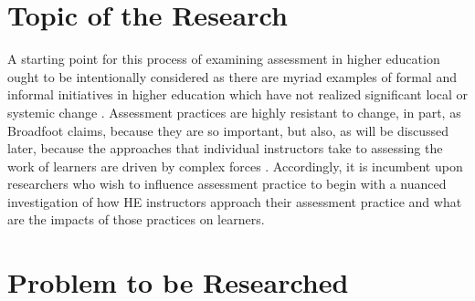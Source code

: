 \documentclass[
]{book}
\begin{document}
\hypertarget{topic-of-the-research}{%
\section*{Topic of the Research}\label{topic-of-the-research}}

A starting point for this process of examining assessment in higher education ought to be intentionally considered as there are myriad examples of formal and informal initiatives in higher education which have not realized significant local or systemic change \citep{broadfootAssessmentTwentyFirstCenturyLearning2016, earlAssessmentLearningUsing2013}. Assessment practices are highly resistant to change, in part, as Broadfoot claims, because they are so important, but also, as will be discussed later, because the approaches that individual instructors take to assessing the work of learners are driven by complex forces \citep{blackAssessmentClassroomLearning1998, delucaDifferentialSituatedView2019, stigginsAssessmentLiteracy1991, willisConceptualisingTeachersAssessment2013}. Accordingly, it is incumbent upon researchers who wish to influence assessment practice to begin with a nuanced investigation of how HE instructors approach their assessment practice and what are the impacts of those practices on learners.

\hypertarget{problem-to-be-researched}{%
\section*{Problem to be Researched}\label{problem-to-be-researched}}
\end{document}
